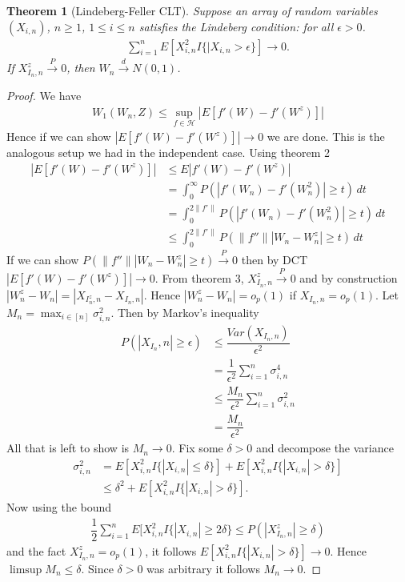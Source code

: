 \documentclass[11pt]{article}
\newcommand{\inp}{\overset{P}{\to}}
\newcommand{\ind}{\overset{d}{\to}}
\newtheorem{theorem}{Theorem}
\begin{document}
\begin{flushleft}
\begin{theorem}[Lindeberg-Feller CLT]
Suppose an array of random variables $(X_{i,n})$, $n \geq 1$, $1 \leq i \leq n$ satisfies the 
Lindeberg condition: for all $\epsilon > 0$.
\begin{align*}
\sum_{i=1}^{n} E[X_{i,n}^2 I\{|X_{i,n} > \epsilon\}] \to 0.
\end{align*}
If $X_{I_n,n}^z \inp 0$, then $W_n \ind N(0,1)$.
\end{theorem}
\begin{proof}
 We have
\begin{align*}
W_1(W_n,Z) \leq \sup_{f \in \mathcal{H}} |E[f'(W) - f'(W^z)]|
\end{align*}
Hence if we can show $|E[f'(W) - f'(W^z)]| \to 0$ we are done. This is the analogous setup we had in the independent case.
Using theorem 2
\begin{align*}
 |E[f'(W) - f'(W^z)]| &\leq  E|f'(W) - f'(W^z)|\\
&= \int_{0}^{\infty} P(|f'(W_n) - f'(W_n^2)| \geq t) \, dt\\
&= \int_{0}^{2 \|f'\|} P(|f'(W_n) - f'(W_n^2)| \geq t) \, dt\\
&\leq \int_{0}^{2\|f'\|} P(\|f''\| |W_n - W^z_n| \geq t) \, dt
\end{align*}
If we can show $ P(\|f''\| |W_n - W^z_n| \geq t) \inp 0$ then by DCT $|E[f'(W) - f'(W^z)]|  \to 0$.
From theorem 3, $X_{I_n,n}^z \inp 0$ and by construction $|W_n^z - W_n| = |X_{I_n^z,n} - X_{I_n,n}|$.
Hence $|W_n^z - W_n| = o_p(1)$ if $X_{I_n,n} = o_p(1)$.
Let $M_n = \max_{i \in [n]} \sigma^2_{i,n}$. Then by Markov's inequality
\begin{align*}
P(|X_{I_n},n| \geq \epsilon) &\leq \dfrac{Var(X_{I_n,n})}{\epsilon^2}\\
&= \dfrac{1}{\epsilon^2} \sum_{i=1}^{n} \sigma_{i,n}^4\\
&\leq \dfrac{M_n}{\epsilon^2} \sum_{i=1}^{n}\sigma_{i,n}^2 \\
&= \dfrac{M_n}{\epsilon^2}
\end{align*}
All that is left to show is $M_n \to 0$. Fix some $\delta > 0$ and decompose the variance
\begin{align*}
\sigma_{i,n}^2 &= E[X_{i,n}^2 I\{|X_{i,n}| \leq \delta\}] + E[X_{i,n}^2 I\{|X_{i,n}| > \delta\}]\\
&\leq \delta^2 +  E[X_{i,n}^2 I\{|X_{i,n}| > \delta\}].
\end{align*}
Now using the bound
\begin{align*}
\dfrac{1}{2} \sum_{i=1}^{n} E[X_{i,n}^2 I\{|X_{i,n}| \geq 2\delta\} \leq P(|X_{I_n,n}^z| \geq \delta)
\end{align*}
and the fact $X_{I_n,n}^z = o_p(1)$, it follows $ E[X_{i,n}^2 I\{|X_{i,n}| > \delta\}] \to 0$. Hence $\limsup M_n \leq \delta$. Since $\delta > 0$ was arbitrary it follows $M_n \to 0$.
\end{proof}


\end{flushleft}

\printbibliography
\end{document}
